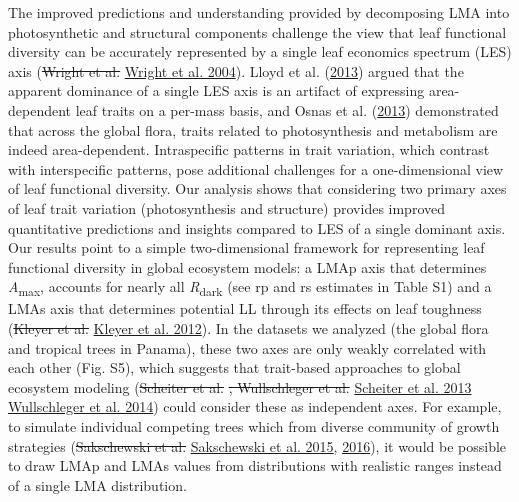 \documentclass[
  12pt,
]{article}
\providecommand{\DIFaddtex}[1]{{\protect\color{blue}\uwave{#1}}} %
\providecommand{\DIFdeltex}[1]{{\protect\color{red}\sout{#1}}}                      %
\providecommand{\DIFaddbegin}{} %
\providecommand{\DIFaddend}{} %
\providecommand{\DIFdelbegin}{} %
\providecommand{\DIFdelend}{} %
\providecommand{\DIFadd}[1]{\texorpdfstring{\DIFaddtex{#1}}{#1}} %
\providecommand{\DIFdel}[1]{\texorpdfstring{\DIFdeltex{#1}}{}} %
\newcommand{\DIFscaledelfig}{0.5}
\newlength{\DIFdelgraphicswidth} %
\newlength{\DIFdelgraphicsheight} %
\newcommand{\DIFaddincludegraphics}[2][]{{\color{blue}\fbox{\DIFOincludegraphics[#1]{#2}}}} %
\newcommand{\DIFdelincludegraphics}[2][]{%
\sbox{\DIFdelgraphicsbox}{\DIFOincludegraphics[#1]{#2}}%
\settoboxwidth{\DIFdelgraphicswidth}{\DIFdelgraphicsbox} %
\settoboxtotalheight{\DIFdelgraphicsheight}{\DIFdelgraphicsbox} %
\scalebox{\DIFscaledelfig}{%
\parbox[b]{\DIFdelgraphicswidth}{\usebox{\DIFdelgraphicsbox}\\[-\baselineskip] \rule{\DIFdelgraphicswidth}{0em}}\llap{\resizebox{\DIFdelgraphicswidth}{\DIFdelgraphicsheight}{%
\setlength{\unitlength}{\DIFdelgraphicswidth}%
\begin{picture}(1,1)%
\thicklines\linethickness{2pt} %
{\color[rgb]{1,0,0}\put(0,0){\framebox(1,1){}}}%
{\color[rgb]{1,0,0}\put(0,0){\line( 1,1){1}}}%
{\color[rgb]{1,0,0}\put(0,1){\line(1,-1){1}}}%
\end{picture}%
}\hspace*{3pt}}} %
} %
\DeclareRobustCommand{\DIFaddbegin}{\DIFOaddbegin \let\includegraphics\DIFaddincludegraphics} %
\DeclareRobustCommand{\DIFaddend}{\DIFOaddend \let\includegraphics\DIFOincludegraphics} %
\DeclareRobustCommand{\DIFdelbegin}{\DIFOdelbegin \let\includegraphics\DIFdelincludegraphics} %
\DeclareRobustCommand{\DIFdelend}{\DIFOaddend \let\includegraphics\DIFOincludegraphics} %
\begin{document}
The improved predictions and understanding provided by decomposing LMA into photosynthetic and structural components challenge the view that leaf functional diversity can be accurately represented by a single leaf economics spectrum (LES) axis (\DIFdelbegin \DIFdel{Wright et al. }\DIFdelend \protect\DIFdelbegin %
\DIFdelend \DIFaddbegin \hyperlink{ref-Wright2004a}{Wright et al. 2004}\DIFaddend ).
Lloyd et al. (\protect\hyperlink{ref-Lloyd2013}{2013}) argued that the apparent dominance of a single LES axis is an artifact of expressing area-dependent leaf traits on a per-mass basis, and Osnas et al. (\protect\hyperlink{ref-Osnas2013}{2013}) demonstrated that across the global flora, traits related to photosynthesis and metabolism are indeed area-dependent.
Intraspecific patterns in trait variation, which contrast with interspecific patterns, pose additional challenges for a one-dimensional view of leaf functional diversity. Our analysis shows that considering two primary axes of leaf trait variation (photosynthesis and structure) provides improved quantitative predictions and insights compared to LES of a single dominant axis.
Our results point to a simple two-dimensional framework for representing leaf functional diversity in global ecosystem models: a LMAp axis that determines \emph{A}\textsubscript{max}, accounts for nearly all \emph{R}\textsubscript{dark} (see rp and rs estimates in Table S1) and a LMAs axis that determines potential LL through its effects on leaf toughness (\DIFdelbegin \DIFdel{Kleyer et al. }\DIFdelend \protect\DIFdelbegin %
\DIFdelend \DIFaddbegin \hyperlink{ref-Kleyer2012}{Kleyer et al. 2012}\DIFaddend ).
In the datasets we analyzed (the global flora and tropical trees in Panama), these two axes are only weakly correlated with each other (Fig. S5), which suggests that trait-based approaches to global ecosystem modeling (\DIFdelbegin \DIFdel{Scheiter et al. }\DIFdelend \protect\DIFdelbegin %
\DIFdel{, Wullschleger et al. }\DIFdelend \DIFaddbegin \hyperlink{ref-Scheiter2013}{Scheiter et al. 2013}\DIFadd{, }\DIFaddend \protect\DIFdelbegin %
\DIFdelend \DIFaddbegin \hyperlink{ref-Wullschleger2014}{Wullschleger et al. 2014}\DIFaddend ) could consider these as independent axes.
For example, to simulate individual competing trees which from diverse community of growth strategies (\DIFdelbegin \DIFdel{Sakschewski et al. }\DIFdelend \protect\DIFdelbegin %
\DIFdelend \DIFaddbegin \hyperlink{ref-Sakschewski2015}{Sakschewski et al. 2015}\DIFaddend , \protect\hyperlink{ref-Sakschewski2016}{2016}), it would be possible to draw LMAp and LMAs values from distributions with realistic ranges instead of a single LMA distribution.
\end{document}
